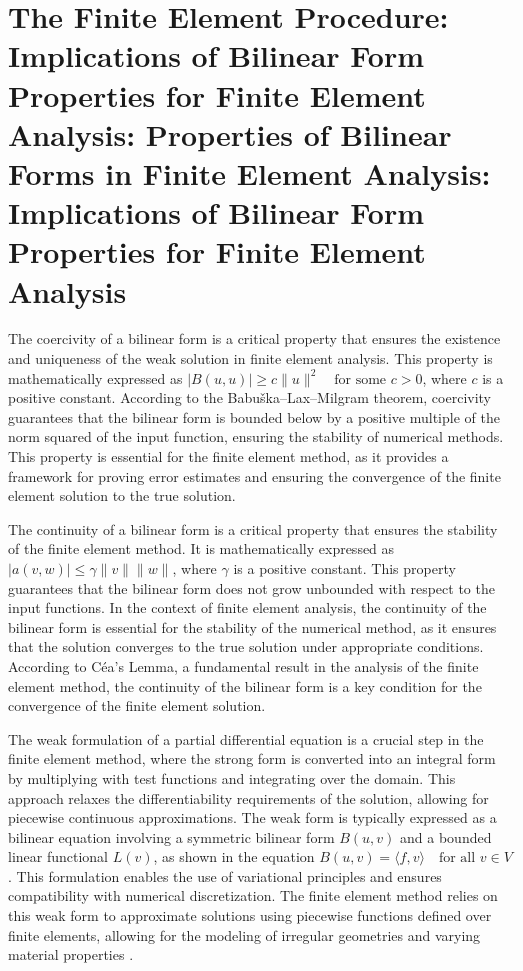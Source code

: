 \documentclass[12pt, a4paper]{article}
\begin{document}
\section{The Finite Element Procedure: Implications of Bilinear Form Properties for Finite Element Analysis: Properties of Bilinear Forms in Finite Element Analysis: Implications of Bilinear Form Properties for Finite Element Analysis}
\label{sec:6ed05cc6-1b84-456f-a603-6ddc760c0d32}

The coercivity of a bilinear form is a critical property that ensures the existence and uniqueness of the weak solution in finite element analysis. This property is mathematically expressed as \(|B(u, u)| \geq c\|u\|^2 \quad \text{for some } c > 0\), where \(c\) is a positive constant. According to the Babuška–Lax–Milgram theorem, coercivity guarantees that the bilinear form is bounded below by a positive multiple of the norm squared of the input function, ensuring the stability of numerical methods. This property is essential for the finite element method, as it provides a framework for proving error estimates and ensuring the convergence of the finite element solution to the true solution.

The continuity of a bilinear form is a critical property that ensures the stability of the finite element method. It is mathematically expressed as \(|a(v, w)| \leq \gamma \|v\| \|w\|\), where \(\gamma\) is a positive constant. This property guarantees that the bilinear form does not grow unbounded with respect to the input functions. In the context of finite element analysis, the continuity of the bilinear form is essential for the stability of the numerical method, as it ensures that the solution converges to the true solution under appropriate conditions. According to Céa's Lemma, a fundamental result in the analysis of the finite element method, the continuity of the bilinear form is a key condition for the convergence of the finite element solution. \cite{src:wiki_c_a_s_lemma-c997aed28ad6}

The weak formulation of a partial differential equation is a crucial step in the finite element method, where the strong form is converted into an integral form by multiplying with test functions and integrating over the domain. This approach relaxes the differentiability requirements of the solution, allowing for piecewise continuous approximations. The weak form is typically expressed as a bilinear equation involving a symmetric bilinear form \(B(u, v)\) and a bounded linear functional \(L(v)\), as shown in the equation \(B(u, v) = \langle f, v \rangle \quad \text{for all } v \in V\) \cite{src:wiki_babu_ka_lax_milgram_theorem-a334b87f26cc}. This formulation enables the use of variational principles and ensures compatibility with numerical discretization. The finite element method relies on this weak form to approximate solutions using piecewise functions defined over finite elements, allowing for the modeling of irregular geometries and varying material properties \cite{src:wiki_boris_galerkin-074a16ec4ded}.
\end{document}
